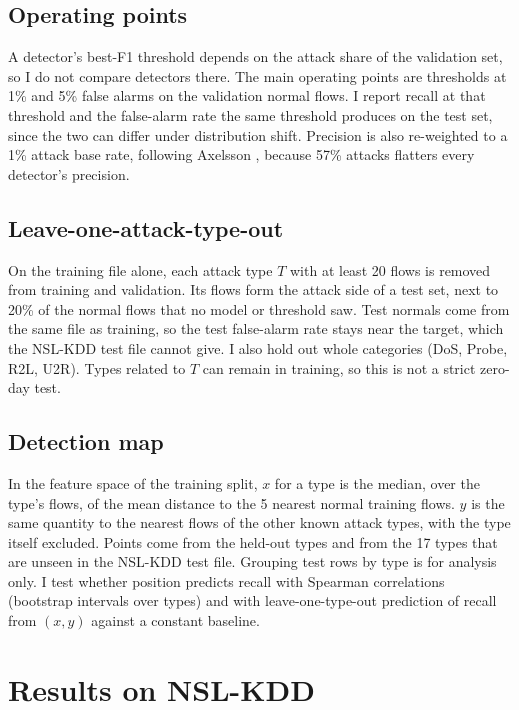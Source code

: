 \documentclass[10pt]{article}
\begin{document}
\subsection{Operating points}

A detector's best-F1 threshold depends on the attack share of the validation set, so I do not compare
detectors there. The main operating points are thresholds at 1\% and 5\% false alarms on the validation normal
flows. I report recall at that threshold and the false-alarm rate the same threshold produces on the test set,
since the two can differ under distribution shift. Precision is also re-weighted to a 1\% attack base rate,
following Axelsson \cite{axelsson1999}, because 57\% attacks flatters every detector's precision.

\subsection{Leave-one-attack-type-out}

On the training file alone, each attack type $T$ with at least 20 flows is removed from training and validation.
Its flows form the attack side of a test set, next to 20\% of the normal flows that no model or threshold
saw. Test normals come from the same file as training, so the test false-alarm rate stays near the target,
which the NSL-KDD test file cannot give. I also hold out whole categories (DoS, Probe, R2L, U2R). Types
related to $T$ can remain in training, so this is not a strict zero-day test.

\subsection{Detection map}

In the feature space of the training split, $x$ for a type is the median, over the type's flows, of the mean
distance to the 5 nearest normal training flows. $y$ is the same quantity to the nearest flows of the other known
attack types, with the type itself excluded. Points come from the held-out types and from the 17 types that
are unseen in the NSL-KDD test file. Grouping test rows by type is for analysis only. I test whether position
predicts recall with Spearman correlations (bootstrap intervals over types) and with leave-one-type-out
prediction of recall from $(x, y)$ against a constant baseline.

\section{Results on NSL-KDD}
\end{document}
